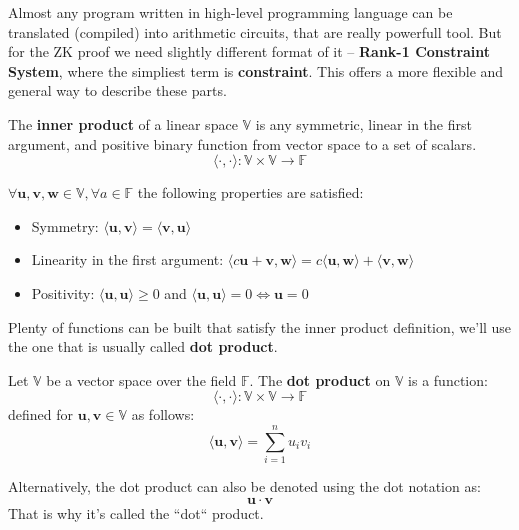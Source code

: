 \documentclass[../lecture-notes.tex]{subfiles}
\begin{document}
Almost any program written in high-level programming language can be translated (compiled) into
arithmetic circuits, that are really powerfull tool. But for the ZK proof we need slightly different
format of it -- \textbf{Rank-1 Constraint System}, where the simpliest term is \textbf{constraint}. 
This offers a more flexible and general way to describe these parts.

\begin{definition}
    The \textbf{inner product} of a linear space $\mathbb{V}$ is any symmetric, linear in the first 
    argument, and positive binary function from vector space to a set of scalars. \\
    \begin{equation*}
        \langle \cdot, \cdot \rangle: \mathbb{V} \times \mathbb{V} \rightarrow \mathbb{F}
    \end{equation*}

    $\forall \mathbf{u}, \mathbf{v}, \mathbf{w} \in \mathbb{V}, \forall a \in \mathbb{F}$ the 
    following properties are satisfied:
    \begin{itemize}
        \item Symmetry: $\langle \mathbf{u}, \mathbf{v} \rangle = \langle \mathbf{v}, \mathbf{u} \rangle$
        \item Linearity in the first argument: $\langle c\mathbf{u} + \mathbf{v}, \mathbf{w} \rangle = c \langle \mathbf{u}, \mathbf{w} \rangle + \langle \mathbf{v}, \mathbf{w} \rangle$
        \item Positivity: $\langle \mathbf{u}, \mathbf{u} \rangle \geq 0$ and $\langle \mathbf{u}, \mathbf{u} \rangle = 0 \Leftrightarrow \mathbf{u} = 0$
    \end{itemize}
\end{definition}

Plenty of functions can be built that satisfy the inner product definition, we'll use the one that
is usually called \textbf{dot product}.
\begin{definition}
    Let $\mathbb{V}$ be a vector space over the field $\mathbb{F}$. The \textbf{dot product} 
    on $\mathbb{V}$ is a function:
    \begin{equation*}
        \langle \cdot, \cdot \rangle: \mathbb{V} \times \mathbb{V} \rightarrow \mathbb{F}
    \end{equation*}
    defined for $\mathbf{u}, \mathbf{v} \in \mathbb{V}$ as follows:
    \begin{equation*}
        \langle \mathbf{u}, \mathbf{v} \rangle = \sum_{i=1}^{n} u_i v_i
    \end{equation*}

    Alternatively, the dot product can also be denoted using the dot notation as:
    \begin{equation*}
        \mathbf{u} \cdot \mathbf{v}
    \end{equation*}
    That is why it's called the ``dot`` product.
\end{definition}
\end{document}
